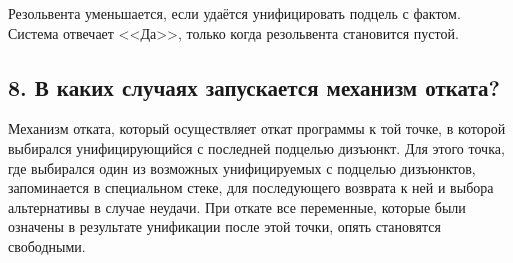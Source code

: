 Резольвента уменьшается, если удаётся унифицировать подцель с фактом. Система отвечает <<Да>>, только когда резольвента становится пустой.

\subsection*{8. В каких случаях запускается механизм отката?}

Механизм отката, который осуществляет откат программы к той точке, в которой выбирался унифицирующийся с последней подцелью дизъюнкт. Для этого точка, где выбирался один из возможных унифицируемых с подцелью дизъюнктов, запоминается в специальном стеке, для последующего возврата к ней и выбора альтернативы в случае неудачи. При откате все переменные, которые были означены в результате унификации после этой точки, опять становятся свободными.

